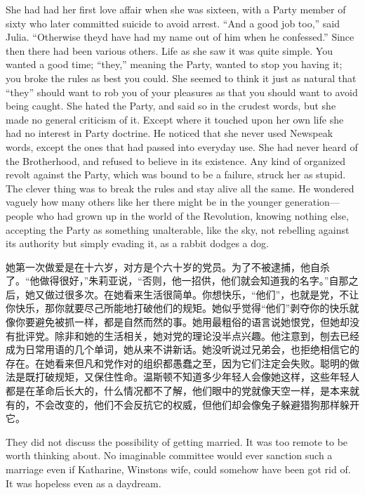 \begin{paracol}{2}
She had had her first love affair when she was sixteen, with a Party
member of sixty who later committed suicide to avoid arrest. ``And a good
job too,'' said Julia. ``Otherwise they\textquotesingle d have had my name
out of him when he confessed.'' Since then there had been various others.
Life as she saw it was quite simple. You wanted a good time; ``they,''
meaning the Party, wanted to stop you having it; you broke the rules as
best you could. She seemed to think it just as natural that ``they''
should want to rob you of your pleasures as that you should want to
avoid being caught. She hated the Party, and said so in the crudest
words, but she made no general criticism of it. Except where it touched
upon her own life she had no interest in Party doctrine. He noticed that
she never used Newspeak words, except the ones that had passed into
everyday use. She had never heard of the Brotherhood, and refused to
believe in its existence. Any kind of organized revolt against the
Party, which was bound to be a failure, struck her as stupid. The clever
thing was to break the rules and stay alive all the same. He wondered
vaguely how many others like her there might be in the younger
generation---people who had grown up in the world of the Revolution,
knowing nothing else, accepting the Party as something unalterable, like
the sky, not rebelling against its authority but simply evading it, as a
rabbit dodges a dog.

\switchcolumn

她第一次做爱是在十六岁，对方是个六十岁的党员。为了不被逮捕，他自杀了。``他做得很好，''朱莉亚说，``否则，他一招供，他们就会知道我的名字。''自那之后，她又做过很多次。在她看来生活很简单。你想快乐，``他们''，也就是党，不让你快乐，那你就要尽己所能地打破他们的规矩。她似乎觉得``他们''剥夺你的快乐就像你要避免被抓一样，都是自然而然的事。她用最粗俗的语言说她恨党，但她却没有批评党。除非和她的生活相关，她对党的理论没半点兴趣。他注意到，刨去已经成为日常用语的几个单词，她从来不讲新话。她没听说过兄弟会，也拒绝相信它的存在。在她看来但凡和党作对的组织都愚蠢之至，因为它们注定会失败。聪明的做法是既打破规矩，又保住性命。温斯顿不知道多少年轻人会像她这样，这些年轻人都是在革命后长大的，什么情况都不了解，他们眼中的党就像天空一样，是本来就有的，不会改变的，他们不会反抗它的权威，但他们却会像兔子躲避猎狗那样躲开它。

\switchcolumn*

They did not discuss the possibility of getting married. It was too
remote to be worth thinking about. No imaginable committee would ever
sanction such a marriage even if Katharine, Winston\textquotesingle s
wife, could somehow have been got rid of. It was hopeless even as a
daydream.


\end{paracol}
